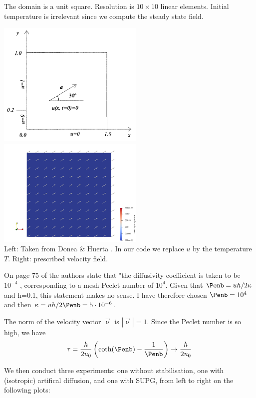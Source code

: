 The domain is a unit square. Resolution is $10\times10$ linear elements. Initial temperature is 
irrelevant since we compute the steady state field. 

\begin{center}
\includegraphics[width=7cm]{python_codes/fieldstone_65/images/setup}
\includegraphics[width=7cm]{python_codes/fieldstone_65/results/exp2/vel}\\
{\captionfont Left: Taken from Donea \& Huerta \cite{dohu03}. In our code we replace $u$ by the 
temperature $T$. Right: prescribed velocity field.}
\end{center}

\begin{remark}
On page 75 of \cite{dohu03} the authors state that 
"the diffusivity coefficient is taken to be $10^{-4}$ , 
corresponding to a mesh Peclet number of $10^4$. 
Given that $\Penb=u h/2\kappa$ and h=0.1, this statement makes no sense.
I have therefore chosen $\Penb=10^4$ and then 
$\kappa=uh/2\Penb = 5\cdot10^{-6}$.
\end{remark}

The norm of the velocity vector $\vec{\upnu}$ is $|\vec{\upnu}|=1$. 
Since the Peclet number is so high, we have 
\[
\tau = \frac{h}{2 u_0} \left( \coth (\Penb) -\frac{1}{\Penb} \right) \rightarrow 
\frac{h}{2 u_0} 
\]

We then conduct three experiments: one without stabilisation, one with (isotropic) artifical diffusion, and 
one with SUPG, from left to right on the following plots:

